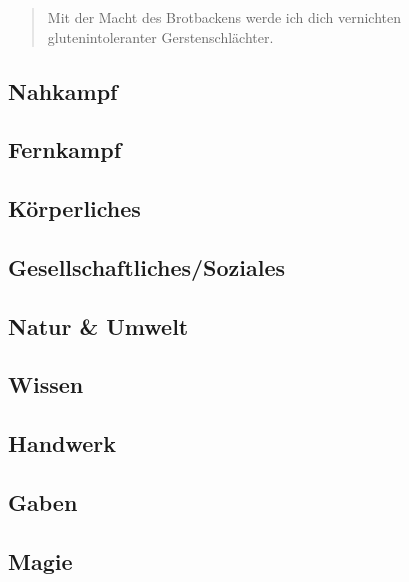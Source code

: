 \begin{quote}
    Mit der Macht des Brotbackens werde ich dich vernichten glutenintoleranter Gerstenschlächter.
\end{quote}
\subsection{Nahkampf}

\subsection{Fernkampf}

\subsection{Körperliches}

\subsection{Gesellschaftliches/Soziales}

\subsection{Natur \& Umwelt}

\subsection{Wissen}

\subsection{Handwerk}

\subsection{Gaben}

\subsection{Magie}